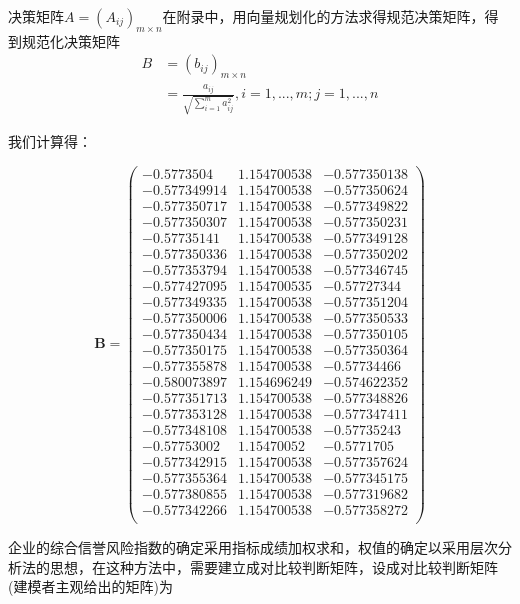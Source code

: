 \documentclass{cumcmthesis}
\begin{document}
决策矩阵$A=(A_{ij})_{m\times n}$在附录中，用向量规划化的方法求得规范决策矩阵，得到规范化决策矩阵
\begin{align}
B &=(b_{ij})_{m\times n}\\
  &= \frac{a_{ij}}{\sqrt{\sum_{i=1}^m a_{ij}^2}},i=1,...,m;j=1,...,n
\end{align}

我们计算得：

\[
\mathbf{B} = \left(
\begin{array}{ccc}
-0.5773504   & 1.154700538 & -0.577350138 \\
-0.577349914 & 1.154700538 & -0.577350624 \\
-0.577350717 & 1.154700538 & -0.577349822 \\
-0.577350307 & 1.154700538 & -0.577350231 \\
-0.57735141  & 1.154700538 & -0.577349128 \\
-0.577350336 & 1.154700538 & -0.577350202 \\
-0.577353794 & 1.154700538 & -0.577346745 \\
-0.577427095 & 1.154700535 & -0.57727344  \\
-0.577349335 & 1.154700538 & -0.577351204 \\
-0.577350006 & 1.154700538 & -0.577350533 \\
-0.577350434 & 1.154700538 & -0.577350105 \\
-0.577350175 & 1.154700538 & -0.577350364 \\
-0.577355878 & 1.154700538 & -0.57734466  \\
-0.580073897 & 1.154696249 & -0.574622352 \\
-0.577351713 & 1.154700538 & -0.577348826 \\
-0.577353128 & 1.154700538 & -0.577347411 \\
-0.577348108 & 1.154700538 & -0.57735243  \\
-0.57753002  & 1.15470052  & -0.5771705   \\
-0.577342915 & 1.154700538 & -0.577357624 \\
-0.577355364 & 1.154700538 & -0.577345175 \\
-0.577380855 & 1.154700538 & -0.577319682 \\
-0.577342266 & 1.154700538 & -0.577358272\\
\end{array} \right)
\]

企业的综合信誉风险指数的确定采用指标成绩加权求和，权值的确定以采用层次分析法的思想，在这种方法中，需要建立成对比较判断矩阵，设成对比较判断矩阵(建模者主观给出的矩阵)为
\end{document}
